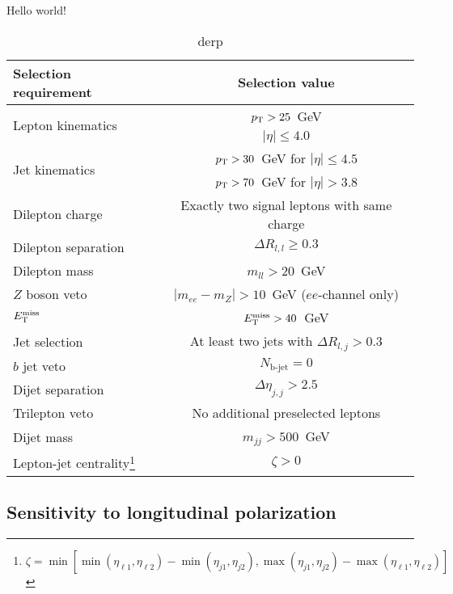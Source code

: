 Hello world!

\begin{table}[htb]
  \centering
  \begin{tabular}{l|c}
    Selection requirement              & Selection value \\
    \hline\hline
    \multirow{2}{*}{Lepton kinematics} & $p_{\mathrm{T}} > 25$~GeV \\
                                       & $|\eta| \le 4.0$ \\
    \multirow{2}{*}{Jet kinematics}    & $p_{\mathrm{T}} > 30$~GeV for $|\eta| \le 4.5$ \\
                                       & $p_{\mathrm{T}} > 70$~GeV for $|\eta| > 3.8$ \\
    \hline
    Dilepton charge                    & Exactly two signal leptons with same charge\\
    Dilepton separation                & $\Delta R_{l,l} \ge 0.3$ \\
    Dilepton mass                      & $m_{ll} > 20$~GeV\\
    $Z$ boson veto                     & $|m_{ee} - m_Z| > 10$~GeV ($ee$-channel only) \\
    $E_{\mathrm{T}}^{\mathrm{miss}}$                             & $E_{\mathrm{T}}^{\mathrm{miss}} > 40$~GeV \\
    Jet selection                      & At least two jets with $\Delta R_{l,j} > 0.3$\\
    $b$ jet veto                       & $N_{\textrm{b-jet}} = 0$\\
    Dijet separation                   & $\Delta\eta_{j,j} > 2.5$\\
    Trilepton veto                     & No additional preselected leptons\\
    Dijet mass                         & $m_{jj} > 500$~GeV\\
    Lepton-jet centrality\footnote{$\zeta = \min [\min (\eta_{\ell1}, \eta_{\ell2} )-\min(\eta_{j1},\eta_{j2}), \max(\eta_{j1},\eta_{j2})-\max(\eta_{\ell1},\eta_{\ell2}) ]$}                                    & $\zeta > 0$\\
    \hline
  \end{tabular}
  \caption{derp}
  \label{tab:sswwupgrade_event_selection}
\end{table}

\subsection{Sensitivity to longitudinal polarization}\label{sec:sswwupgrade_longitudinal_sens}
